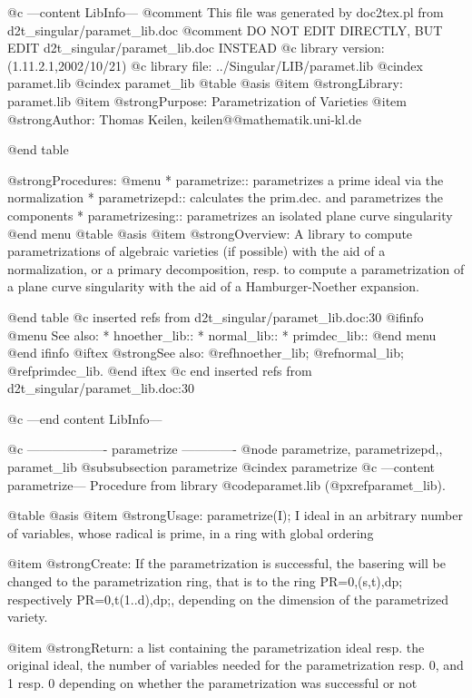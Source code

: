 @c ---content LibInfo---
@comment This file was generated by doc2tex.pl from d2t_singular/paramet_lib.doc
@comment DO NOT EDIT DIRECTLY, BUT EDIT d2t_singular/paramet_lib.doc INSTEAD
@c library version: (1.11.2.1,2002/10/21)
@c library file: ../Singular/LIB/paramet.lib
@cindex paramet.lib
@cindex paramet_lib
@table @asis
@item @strong{Library:}
paramet.lib
@item @strong{Purpose:}
   Parametrization of Varieties
@item @strong{Author:}
Thomas Keilen, keilen@@mathematik.uni-kl.de

@end table

@strong{Procedures:}
@menu
* parametrize:: parametrizes a prime ideal via the normalization
* parametrizepd:: calculates the prim.dec. and parametrizes the components
* parametrizesing:: parametrizes an isolated plane curve singularity
@end menu
@table @asis
@item @strong{Overview:}
A library to compute parametrizations of algebraic varieties (if possible)
with the aid of a normalization, or a primary decomposition, resp. to compute
a parametrization of a plane curve singularity with the aid of a
Hamburger-Noether expansion.

@end table
@c inserted refs from d2t_singular/paramet_lib.doc:30
@ifinfo
@menu
See also:
* hnoether_lib::
* normal_lib::
* primdec_lib::
@end menu
@end ifinfo
@iftex
@strong{See also:}
@ref{hnoether_lib};
@ref{normal_lib};
@ref{primdec_lib}.
@end iftex
@c end inserted refs from d2t_singular/paramet_lib.doc:30

@c ---end content LibInfo---

@c ------------------- parametrize -------------
@node parametrize, parametrizepd,, paramet_lib
@subsubsection parametrize
@cindex parametrize
@c ---content parametrize---
Procedure from library @code{paramet.lib} (@pxref{paramet_lib}).

@table @asis
@item @strong{Usage:}
parametrize(I); I ideal in an arbitrary number of variables,
whose radical is prime, in a ring with global ordering

@item @strong{Create:}
If the parametrization is successful, the basering will be changed to
the parametrization ring, that is to the ring PR=0,(s,t),dp;
respectively PR=0,t(1..d),dp;, depending on the dimension of the
parametrized variety.

@item @strong{Return:}
a list containing the parametrization ideal resp. the original ideal,
the number of variables needed for the parametrization resp. 0, and
1 resp. 0 depending on whether the parametrization was successful
or not

